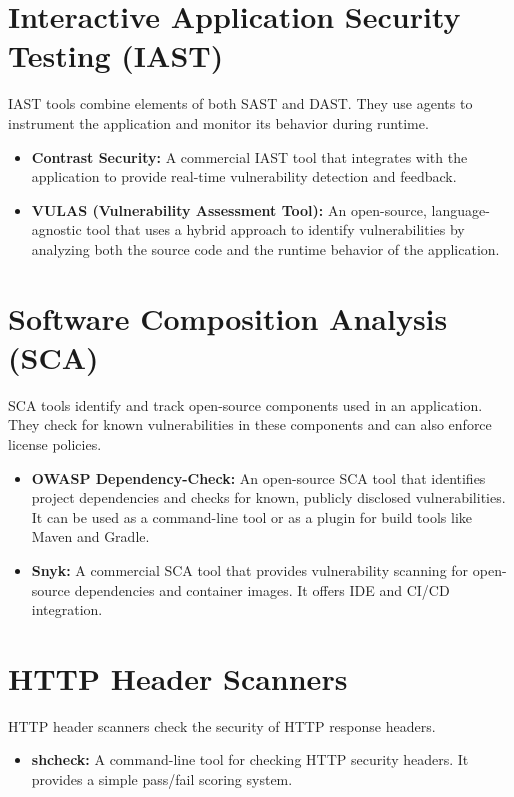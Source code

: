 \section{Interactive Application Security Testing (IAST)}
IAST tools combine elements of both SAST and DAST. They use agents to instrument the application and monitor its behavior during runtime.

\begin{itemize}
    \item \textbf{Contrast Security:} A commercial IAST tool that integrates with the application to provide real-time vulnerability detection and feedback.
    \item \textbf{VULAS (Vulnerability Assessment Tool):} An open-source, language-agnostic tool that uses a hybrid approach to identify vulnerabilities by analyzing both the source code and the runtime behavior of the application.
\end{itemize}

\section{Software Composition Analysis (SCA)}
SCA tools identify and track open-source components used in an application. They check for known vulnerabilities in these components and can also enforce license policies.

\begin{itemize}
    \item \textbf{OWASP Dependency-Check:} An open-source SCA tool that identifies project dependencies and checks for known, publicly disclosed vulnerabilities. It can be used as a command-line tool or as a plugin for build tools like Maven and Gradle.
    \item \textbf{Snyk:} A commercial SCA tool that provides vulnerability scanning for open-source dependencies and container images. It offers IDE and CI/CD integration.
\end{itemize}

\section{HTTP Header Scanners}
HTTP header scanners check the security of HTTP response headers.

\begin{itemize}
    \item \textbf{shcheck:} A command-line tool for checking HTTP security headers. It provides a simple pass/fail scoring system.
\end{itemize}

